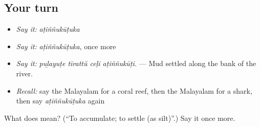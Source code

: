 \subsection*{Your turn}
\begin{itemize}
\raggedright
  \item \emph{Say it:} \emph{aṭiññukūṭuka}
  \item \emph{Say it:} \emph{aṭiññukūṭuka}, once more
  \item \emph{Say it:} \emph{puḻayuṭe tīrattŭ ceḷi aṭiññukūṭi.} — Mud settled along the bank of the river.
  \item \emph{Recall:} say the Malayalam for a coral reef, then the Malayalam for a shark, then say \emph{aṭiññukūṭuka} again
\end{itemize}

\begin{tcolorbox}[breakable,colback=teal!4,colframe=teal!35!black,title={Before you move on}]
What does  mean? (\textquotedblleft{}To accumulate; to settle (as silt)\textquotedblright{}.) Say it once more.
\end{tcolorbox}
